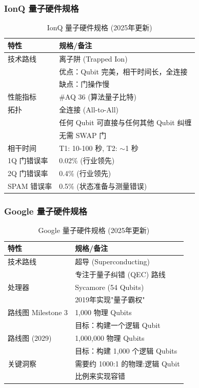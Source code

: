 \documentclass[11pt,a4paper]{article}
\begin{document}
\subsubsection{IonQ 量子硬件规格}

\begin{table}[H]
\centering
\caption{IonQ 量子硬件规格 (2025年更新)}
\begin{tabular}{@{}ll@{}}
\toprule
\textbf{特性} & \textbf{规格/备注} \\ \midrule
技术路线 & 离子阱 (Trapped Ion) \\
& 优点：Qubit 完美，相干时间长，全连接 \\
& 缺点：门操作慢 \\
性能指标 & \#AQ 36 (算法量子比特) \\
拓扑 & 全连接 (All-to-All) \\
& 任何 Qubit 可直接与任何其他 Qubit 纠缠 \\
& 无需 SWAP 门 \\
相干时间 & T1: 10-100 秒, T2: $\sim$1 秒 \\
1Q 门错误率 & 0.02\% (行业领先) \\
2Q 门错误率 & 0.4\% (行业领先) \\
SPAM 错误率 & 0.5\% (状态准备与测量错误) \\ \bottomrule
\end{tabular}
\end{table}

\subsubsection{Google 量子硬件规格}

\begin{table}[H]
\centering
\caption{Google 量子硬件规格 (2025年更新)}
\begin{tabular}{@{}ll@{}}
\toprule
\textbf{特性} & \textbf{规格/备注} \\ \midrule
技术路线 & 超导 (Superconducting) \\
& 专注于量子纠错 (QEC) 路线 \\
处理器 & Sycamore (54 Qubits) \\
& 2019年实现"量子霸权" \\
路线图 Milestone 3 & 1,000 物理 Qubits \\
& 目标：构建一个逻辑 Qubit \\
路线图 (2029) & 1,000,000 物理 Qubits \\
& 目标：构建 1,000 个逻辑 Qubits \\
关键洞察 & 需要约 1000:1 的物理:逻辑 Qubit \\
& 比例来实现容错 \\ \bottomrule
\end{tabular}
\end{table}
\end{document}
